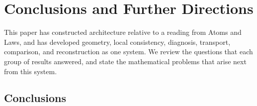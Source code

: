 \chapter*{Conclusions and Further Directions}

This paper has constructed architecture relative to a reading from Atoms and Laws, and has
developed geometry, local consistency, diagnosis, transport, comparison, and reconstruction
as one system. We review the questions that each group of results answered, and state the
mathematical problems that arise next from this system.

\section*{Conclusions}

